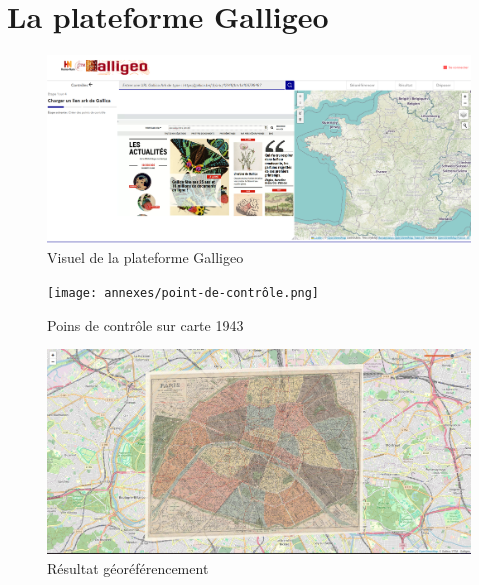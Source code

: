 \documentclass[openany, a4paper, 12pt, twoside]{book}
\begin{document}
\chapter{La plateforme Galligeo}
\begin{figure}
    \centering
    \includegraphics[width=1\linewidth]{annexes/plateforme-galligeo.png}
    \caption{Visuel de la plateforme Galligeo}
    \label{fig:platefomre-galligeo}
\end{figure}
\begin{figure}
    \centering
    \texttt{[image: annexes/point-de-contrôle.png]}
    \caption{Poins de contrôle sur carte 1943}
    \label{fig:points-de-contrôle}
\end{figure}
\begin{figure}
    \centering
    \includegraphics[width=1\linewidth]{annexes/résultat-géoréférencement.png}
    \caption{Résultat géoréférencement}
    \label{fig:résultat-géoréférencement}
\end{figure}
\end{document}
